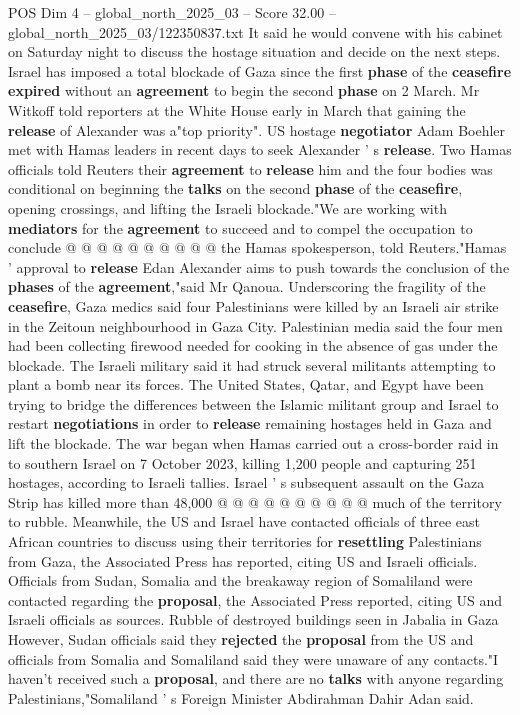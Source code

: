 \begin{textsample}{POS Dim 4 – global\_north\_2025\_03 – Score 32.00 – global\_north\_2025\_03/122350837.txt}
It said he would convene with his cabinet on Saturday night to discuss the hostage situation and decide on the next steps.
Israel has imposed a total blockade of Gaza since the first \textbf{phase} of the \textbf{ceasefire} \textbf{expired} without an \textbf{agreement} to begin the second \textbf{phase} on 2 March.
Mr Witkoff told reporters at the White House early in March that gaining the \textbf{release} of Alexander was a"top priority".
US hostage \textbf{negotiator} Adam Boehler met with Hamas leaders in recent days to seek Alexander ' s \textbf{release}.
Two Hamas officials told Reuters their \textbf{agreement} to \textbf{release} him and the four bodies was conditional on beginning the \textbf{talks} on the second \textbf{phase} of the \textbf{ceasefire}, opening crossings, and lifting the Israeli blockade."We are working with \textbf{mediators} for the \textbf{agreement} to succeed and to compel the occupation to conclude @ @ @ @ @ @ @ @ @ @ the Hamas spokesperson, told Reuters."Hamas ' approval to \textbf{release} Edan Alexander aims to push towards the conclusion of the \textbf{phases} of the \textbf{agreement},"said Mr Qanoua.
Underscoring the fragility of the \textbf{ceasefire}, Gaza medics said four Palestinians were killed by an Israeli air strike in the Zeitoun neighbourhood in Gaza City.
Palestinian media said the four men had been collecting firewood needed for cooking in the absence of gas under the blockade.
The Israeli military said it had struck several militants attempting to plant a bomb near its forces.
The United States, Qatar, and Egypt have been trying to bridge the differences between the Islamic militant group and Israel to restart \textbf{negotiations} in order to \textbf{release} remaining hostages held in Gaza and lift the blockade.
The war began when Hamas carried out a cross-border raid in to southern Israel on 7 October 2023, killing 1,200 people and capturing 251 hostages, according to Israeli tallies.
Israel ' s subsequent assault on the Gaza Strip has killed more than 48,000 @ @ @ @ @ @ @ @ @ @ much of the territory to rubble.
Meanwhile, the US and Israel have contacted officials of three east African countries to discuss using their territories for \textbf{resettling} Palestinians from Gaza, the Associated Press has reported, citing US and Israeli officials.
Officials from Sudan, Somalia and the breakaway region of Somaliland were contacted regarding the \textbf{proposal}, the Associated Press reported, citing US and Israeli officials as sources.
Rubble of destroyed buildings seen in Jabalia in Gaza However, Sudan officials said they \textbf{rejected} the \textbf{proposal} from the US and officials from Somalia and Somaliland said they were unaware of any contacts."I haven't received such a \textbf{proposal}, and there are no \textbf{talks} with anyone regarding Palestinians,"Somaliland ' s Foreign Minister Abdirahman Dahir Adan said.

\end{textsample}
